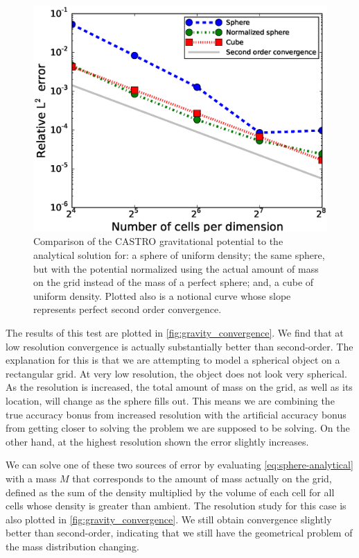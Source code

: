 \documentclass[iop]{../emulateapj}
\begin{document}
\begin{figure}
  \centering
  \includegraphics[scale=0.45]{plots/phi_comparison}
  \caption{Comparison of the CASTRO gravitational potential to the analytical solution for: 
    a sphere of uniform density; the same sphere, but with the potential normalized using the 
    actual amount of mass on the grid instead of the mass of a perfect sphere; and, a 
    cube of uniform density. Plotted also is a notional curve whose slope represents
    perfect second order convergence.\label{fig:gravity_convergence}}
\end{figure}

The results of this test are plotted in \autoref{fig:gravity_convergence}. 
We find that at low resolution 
convergence is actually substantially better than second-order. The 
explanation for this is that we are attempting to model a spherical 
object on a rectangular grid. At very low resolution, the object does 
not look very spherical. As the resolution is increased, the total 
amount of mass on the grid, as well as its location, will change 
as the sphere fills out. This means we are combining the true accuracy 
bonus from increased resolution with the artificial accuracy bonus 
from getting closer to solving the problem we are supposed to be solving. 
On the other hand, at the highest resolution shown the error slightly increases.

We can solve one of these two sources of error by evaluating 
\autoref{eq:sphere-analytical} with a mass $M$ that corresponds to the
amount of mass actually on the grid, defined as the sum of the density
multiplied by the volume of each cell for all cells whose density is 
greater than ambient. The resolution study for this case is also
plotted in \autoref{fig:gravity_convergence}. We still obtain
convergence slightly better than second-order, indicating that we 
still have the geometrical problem of the mass distribution changing.
\end{document}
